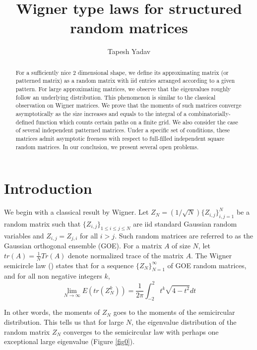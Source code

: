 \documentclass[12pt]{amsart}
\title[Wigner type laws for structured random matrices]{Wigner type laws for structured random matrices}
\author{
Tapesh Yadav
}
\theoremstyle{definition}
\theoremstyle{remark}
\newcommand\red{\color{red}}
\begin{document}

\begin{abstract}
    For a sufficiently nice 2 dimensional shape, we define its approximating matrix (or patterned matrix) as a random matrix with iid entries arranged according to a given pattern. For large approximating matrices, we observe that the eigenvalues roughly follow an underlying distribution. This phenomenon is similar to the classical observation on Wigner matrices. We prove that the moments of such matrices converge asymptotically as the size increases and equals to the integral of a combinatorially-defined function which counts certain paths on a finite grid. 
     We also consider the case of several independent patterned matrices. Under a specific set of conditions, these matrices admit asymptotic freeness with respect to full-filled independent square random matrices. 
     In our conclusion, we present several open problems.
\end{abstract}
\maketitle




\section{Introduction}


We begin with a classical result by Wigner. Let $Z_N = (1/\sqrt{N})\{Z_{i,j}\}_{i,j=1}^N$ be a random matrix such that $\{Z_{i,j}\}_{1 \leq i \leq j \leq N}$ are iid standard Gaussian random variables and $Z_{i,j} = Z_{j,i}$ for all $i > j$. Such random matrices are referred to as the Gaussian orthogonal ensemble (GOE). For a matrix $A$ of size $N$, let $tr(A)=\frac{1}{N}Tr(A)$ denote normalized trace of the matrix $A$. The Wigner semicircle law (\cite{mingo2017free}) states that for a sequence $\{Z_N\}_{N=1}^\infty$ of GOE random matrices, and for all non negative integers $k$,
    $$ \lim_{N \to \infty} E(tr(Z_N^k)) = \frac{1}{2\pi} \int_{-2}^2 t^k \sqrt{4-t^2} dt$$
    
In other words, the moments of $Z_N$ goes to the moments of the semicircular distribution. This tells us that for large $N$, the eigenvalue distribution of the random matrix $Z_N$ converges to the semicircular law with perhaps one exceptional large eigenvalue (Figure \ref{fig0}). 
\end{document}

